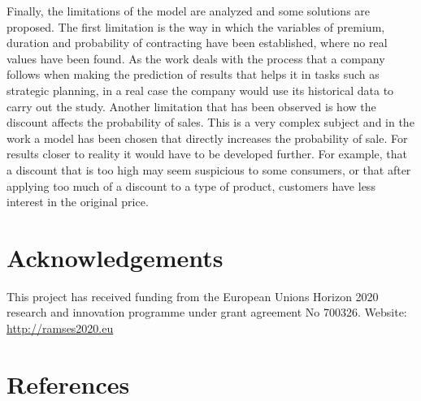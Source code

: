 \documentclass[review]{elsarticle}
\begin{document}
Finally, the limitations of the model are analyzed and some solutions are proposed.
The first limitation is the way in which the variables of premium, duration and probability of contracting have been established, where no real values have been found.
As the work deals with the process that a company follows when making the prediction of results that helps it in tasks such as strategic planning, in a real case the company would use its historical data to carry out the study.
Another limitation that has been observed is how the discount affects the probability of sales. This is a very complex subject and in the work a model has been chosen that directly increases the probability of sale. For results closer to reality it would have to be developed further. For example, that a discount
that is too high may seem suspicious to some consumers, or that after applying too much of a discount to a type of product, customers have less interest in the original price.



\section*{Acknowledgements}
This project has received funding from the European Unions
Horizon 2020 research and innovation programme under grant
agreement No 700326. Website: 
\url{http://ramses2020.eu}



\section*{References}




\end{document}
